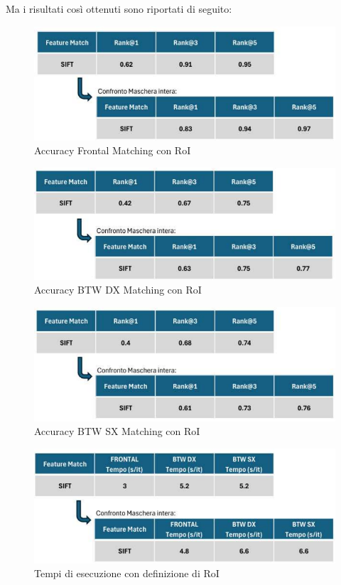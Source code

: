 \documentclass[12pt,a4paper,openright,twoside]{book}
\begin{document}
Ma i risultati così ottenuti sono riportati di seguito:
\begin{figure}[H]
	\centering
	\includegraphics{figures/frontal3_1.pdf}
   	\caption{Accuracy Frontal Matching con RoI}
	\label{fig:frontal3}
\end{figure}
\begin{figure}[H]
	\centering
	\includegraphics{figures/dx3_1.pdf}
    	\caption{Accuracy BTW DX Matching con RoI}
	\label{fig:dx3}
\end{figure}
\begin{figure}[H]
	\centering
	\includegraphics{figures/sx3_1.pdf}
    	\caption{Accuracy BTW SX Matching con RoI}
	\label{fig:sx3}
\end{figure}
\begin{figure}[H]
	\centering
	\includegraphics{figures/tempi3_1.pdf}
    	\caption{Tempi di esecuzione con definizione di RoI}
	\label{fig:tempi3}
\end{figure}
\end{document}
